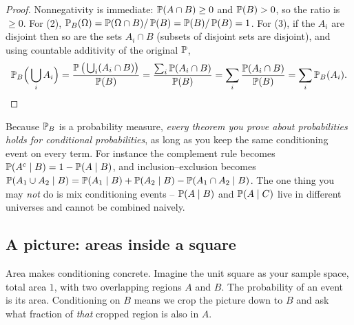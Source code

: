 \begin{proof}
Nonnegativity is immediate: $\P(A\cap B) \ge 0$ and $\P(B) > 0$, so the ratio is $\ge 0$. For (2), $\P_B(\Omega) = \P(\Omega \cap B)/\P(B) = \P(B)/\P(B) = 1$. For (3), if the $A_i$ are disjoint then so are the sets $A_i \cap B$ (subsets of disjoint sets are disjoint), and using countable additivity of the original $\P$,
\[
\P_B\!\Big(\bigcup_i A_i\Big)
= \frac{\P\big(\bigcup_i (A_i \cap B)\big)}{\P(B)}
= \frac{\sum_i \P(A_i \cap B)}{\P(B)}
= \sum_i \frac{\P(A_i \cap B)}{\P(B)}
= \sum_i \P_B(A_i). \qedhere
\]
\end{proof}

\begin{happeningbox}
Because $\P_B$ is a probability measure, \emph{every theorem you prove about probabilities holds for conditional probabilities}, as long as you keep the same conditioning event on every term. For instance the complement rule becomes $\P(A^c \given B) = 1 - \P(A \given B)$, and inclusion--exclusion becomes $\P(A_1 \cup A_2 \given B) = \P(A_1\given B) + \P(A_2 \given B) - \P(A_1 \cap A_2 \given B)$. The one thing you may \emph{not} do is mix conditioning events -- $\P(A\given B)$ and $\P(A \given C)$ live in different universes and cannot be combined naively.
\end{happeningbox}

\subsection{A picture: areas inside a square}

Area makes conditioning concrete. Imagine the unit square as your sample space, total area $1$, with two overlapping regions $A$ and $B$. The probability of an event is its area. Conditioning on $B$ means we crop the picture down to $B$ and ask what fraction of \emph{that} cropped region is also in $A$.

